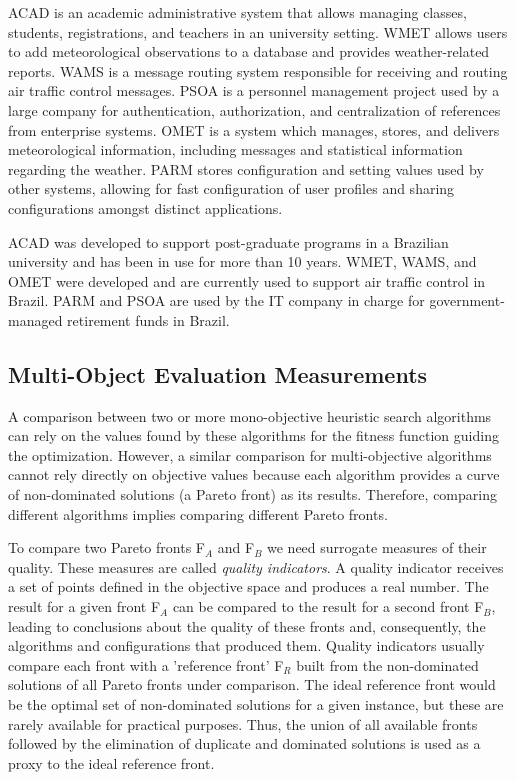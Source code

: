 \documentclass[conference]{IEEEtran}
\begin{document}
ACAD is an academic administrative system that allows managing classes, students, registrations, and teachers in an university setting. WMET allows users to add meteorological observations to a database and provides weather-related reports. WAMS is a message routing system responsible for receiving and routing air traffic control messages. PSOA is a personnel management project used by a large company for authentication, authorization, and centralization of references from enterprise systems. OMET is a system which manages, stores, and delivers meteorological information, including messages and statistical information regarding the weather. PARM stores configuration and setting values used by other systems, allowing for fast configuration of user profiles and sharing configurations amongst distinct applications. 

ACAD was developed to support post-graduate programs in a Brazilian university and has been in use for more than 10 years. WMET, WAMS, and OMET were developed and are currently used to support air traffic control in Brazil. PARM and PSOA are used by the IT company in charge for government-managed retirement funds in Brazil.	

\subsection{Multi-Object Evaluation Measurements}
A comparison between two or more mono-objective heuristic search algorithms can rely on the values found by these algorithms for the fitness function guiding the optimization. However, a similar comparison for multi-objective algorithms cannot rely directly on objective values because each algorithm provides a curve of non-dominated solutions (a Pareto front) as its results. Therefore, comparing different algorithms implies comparing different Pareto fronts. 

To compare two Pareto fronts F$_{A}$ and F$_{B}$ we need surrogate measures of their quality. These measures are called {\it quality indicators}. A quality indicator receives a set of points defined in the objective space and produces a real number. The result for a given front F$_{A}$ can be compared to the result for a second front F$_{B}$, leading to conclusions about the quality of these fronts and, consequently, the algorithms and configurations that produced them. Quality indicators usually compare each front with a 'reference front' F$_{R}$ built from the non-dominated solutions of all Pareto fronts under comparison. The ideal reference front would be the optimal set of non-dominated solutions for a given instance, but these are rarely available for practical purposes. Thus, the union of all available fronts followed by the elimination of duplicate and dominated solutions is used as a proxy to the ideal reference front. 
\end{document}
